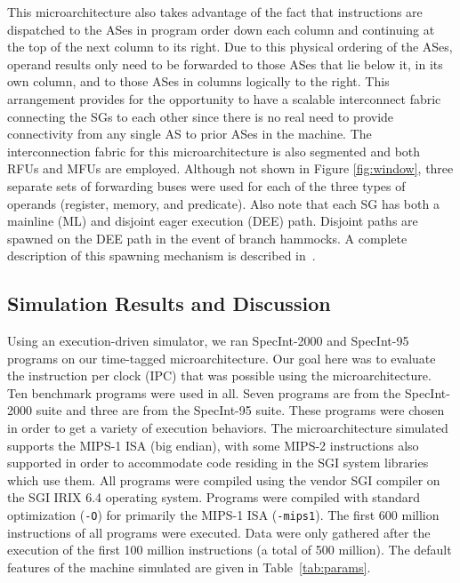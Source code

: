 \documentclass[10pt,twocolumn]{article}
\begin{document}
This microarchitecture also takes advantage of the fact that
instructions are dispatched to the ASes in program order down
each column and continuing at the top of the next column to its right.
Due to this physical ordering of the ASes, operand results
only need to be forwarded to those ASes that lie below it, in its
own column, and to those ASes in columns logically to the
right.  
This arrangement provides for the opportunity to have 
a scalable interconnect
fabric connecting the SGs to each other since
there is no real need to provide connectivity
from any single AS to prior ASes in the machine.
The interconnection fabric for this microarchitecture
is also segmented and both RFUs and MFUs are employed.
Although not shown in Figure \ref{fig:window},
three separate sets of forwarding buses were used for
each of the three types of operands (register, memory,
and predicate).
Also note that each SG has both a mainline (ML)
and disjoint eager execution (DEE) path.  Disjoint paths
are spawned on the DEE path in the event of branch hammocks.
A complete description of this spawning mechanism is described 
in~\cite{Uht02}.
%
%
\vspace{-0.25in}
\subsection{Simulation Results and Discussion}
\vspace{-0.15in}
%
Using an execution-driven simulator, we ran
SpecInt-2000 and SpecInt-95 programs on our
time-tagged microarchitecture.  
Our goal here was to evaluate
the instruction per clock (IPC) that was possible using
the microarchitecture.
Ten benchmark programs were used
in all.  
Seven programs are from the SpecInt-2000 suite and
three are from the SpecInt-95 suite.  
These programs were
chosen in order to get a variety of execution behaviors.
The microarchitecture simulated supports 
the MIPS-1 ISA (big endian), with some MIPS-2
instructions also supported in order to accommodate code residing in
the SGI system libraries which use them.
All programs were compiled using the vendor SGI compiler on
the SGI IRIX 6.4 operating system.
Programs were compiled with
standard optimization ({\tt -O}) for primarily the MIPS-1 ISA ({\tt -mips1}).
The first 600 million instructions of all programs were
executed.  Data were only gathered after the execution of
the first 100 million instructions (a total of 500 million).
The default features of the machine simulated are
given in Table~\ref{tab:params}.
\end{document}
